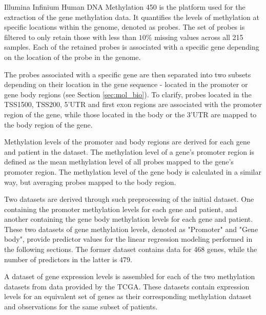 Illumina Infinium Human DNA Methylation 450 is the platform used for the extraction of the gene methylation data. It quantifies the levels of methylation at specific locations within the genome, denoted as probes. The set of probes is filtered to only retain those with less than $10\%$ missing values across all 215 samples. Each of the retained probes is associated with a specific gene depending on the location of the probe in the genome.

The probes associated with a specific gene are then separated into two subsets depending on their location in the gene sequence - located in the promoter or gene body regions (see Section \ref{sec:mol_bio}). To clarify, probes located in the TSS1500, TSS200, 5'UTR and first exon regions are associated with the promoter region of the gene, while those located in the body or the 3'UTR are mapped to the body region of the gene.

Methylation levels of the promoter and body regions are derived for each gene and patient in the dataset. The methylation level of a gene's promoter region is defined as the mean methylation level of all probes mapped to the gene's promoter region. The methylation level of the gene body is calculated in a similar way, but averaging probes mapped to the body region.

Two datasets are derived through such preprocessing of the initial dataset. One containing the promoter methylation levels for each gene and patient, and another containing the gene body methylation levels for each gene and patient. These two datasets of gene methylation levels, denoted as "Promoter" and "Gene body", provide predictor values for the linear regression modeling performed in the following sections. The former dataset contains data for 468 genes, while the number of predictors in the latter is 479. 

A dataset of gene expression levels is assembled for each of the two methylation datasets from data provided by the TCGA. These datasets contain expression levels for an equivalent set of genes as their corresponding methylation dataset and observations for the same subset of patients.


